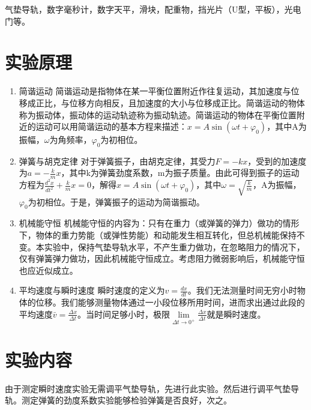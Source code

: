 \documentclass[11pt]{article}
\begin{document}
    气垫导轨，数字毫秒计，数字天平，滑块，配重物，挡光片（U型，平板），光电门等。

\section{实验原理}
\begin{enumerate}
    \item 简谐运动 \newline \hspace*{2em} 简谐运动是指物体在某一平衡位置附近作往复运动，其加速度与位移成正比，与位移方向相反，且加速度的大小与位移成正比。简谐运动的物体称为振动体，振动体的运动轨迹称为振动轨迹。简谐运动的物体在平衡位置附近的运动可以用简谐运动的基本方程来描述：$x=A\sin(\omega t+\varphi_0)$，其中A为振幅，$\omega$为角频率，$\varphi_0$为初相位。
    \item 弹簧与胡克定律 \newline \hspace*{2em} 对于弹簧振子，由胡克定律，其受力$F=-kx$，受到的加速度为$a=-\frac{k}{m}x$，其中k为弹簧劲度系数，m为振子质量。由此可得到振子的运动方程为$\frac{d^2x}{dt^2}+\frac{k}{m}x=0$，解得$x=A\sin(\omega t+\varphi_0)$，其中$\omega=\sqrt{\frac{k}{m}}$，A为振幅，$\varphi_0$为初相位。于是，弹簧振子的运动为简谐振动。
    \item 机械能守恒 \newline \hspace*{2em} 机械能守恒的内容为：只有在重力（或弹簧的弹力）做功的情形下，物体的重力势能（或弹性势能）和动能发生相互转化，但总机械能保持不变。本实验中，保持气垫导轨水平，不产生重力做功，在忽略阻力的情况下，仅有弹簧弹力做功，因此机械能守恒成立。考虑阻力微弱影响后，机械能守恒也应近似成立。
    \item 平均速度与瞬时速度 \newline \hspace*{2em} 瞬时速度的定义为$v=\frac{dx}{dt}$。我们无法测量时间无穷小时物体的位移。我们能够测量物体通过一小段位移所用时间，进而求出通过此段的平均速度$\bar{v}=\frac{\Delta x}{\Delta t}$。当时间足够小时，极限$\lim\limits_{\Delta t \to 0^{+}}\frac{\Delta x}{\Delta t}$就是瞬时速度。
\end{enumerate}


\section{实验内容}
    由于测定瞬时速度实验无需调平气垫导轨，先进行此实验。然后进行调平气垫导轨。测定弹簧的劲度系数实验能够检验弹簧是否良好，次之。
\end{document}
